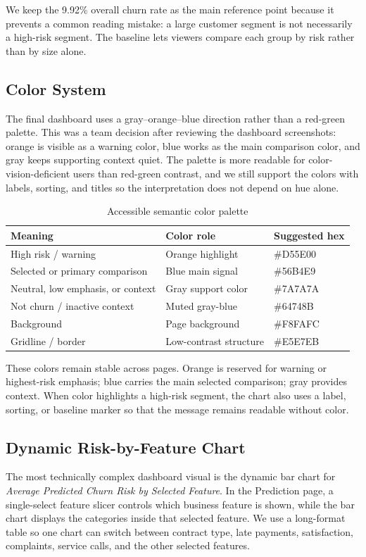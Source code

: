 We keep the 9.92\% overall churn rate as the main reference point because it
prevents a common reading mistake: a large customer segment is not necessarily a
high-risk segment. The baseline lets viewers compare each group by risk rather
than by size alone.

\subsection{Color System}
The final dashboard uses a gray--orange--blue direction rather than a red-green
palette. This was a team decision after reviewing the dashboard screenshots:
orange is visible as a warning color, blue works as the main comparison color,
and gray keeps supporting context quiet. The palette is more readable for
color-vision-deficient users than red-green contrast, and we still support the
colors with labels, sorting, and titles so the interpretation does not depend on
hue alone.

\begin{table}[h]
\centering
\caption{Accessible semantic color palette}
\begin{tabular}{lll}
\toprule
\textbf{Meaning} & \textbf{Color role} & \textbf{Suggested hex} \\
\midrule
High risk / warning & Orange highlight & \#D55E00 \\
Selected or primary comparison & Blue main signal & \#56B4E9 \\
Neutral, low emphasis, or context & Gray support color & \#7A7A7A \\
Not churn / inactive context & Muted gray-blue & \#64748B \\
Background & Page background & \#F8FAFC \\
Gridline / border & Low-contrast structure & \#E5E7EB \\
\bottomrule
\end{tabular}
\end{table}

These colors remain stable across pages. Orange is reserved for warning or
highest-risk emphasis; blue carries the main selected comparison; gray provides
context. When color highlights a high-risk segment, the chart also uses a label,
sorting, or baseline marker so that the message remains readable without color.

\subsection{Dynamic Risk-by-Feature Chart}
The most technically complex dashboard visual is the dynamic bar chart for
\textit{Average Predicted Churn Risk by Selected Feature}. In the Prediction
page, a single-select feature slicer controls which business feature is shown,
while the bar chart displays the categories inside that selected feature. We use
a long-format table so one chart can switch between contract type, late
payments, satisfaction, complaints, service calls, and the other selected
features.

